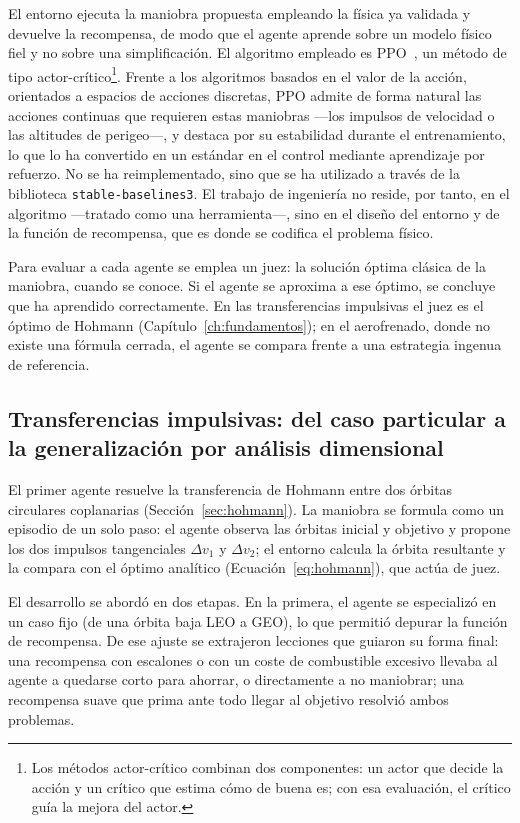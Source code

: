El entorno ejecuta la maniobra propuesta empleando la física ya validada y devuelve la recompensa, de modo que el agente aprende sobre un modelo físico fiel y no sobre una simplificación. El algoritmo empleado es \gls{PPO}~\cite{schulman2017ppo}, un método de tipo actor-crítico\footnote{Los métodos actor-crítico combinan dos componentes: un actor que decide la acción y un crítico que estima cómo de buena es; con esa evaluación, el crítico guía la mejora del actor.}. Frente a los algoritmos basados en el valor de la acción, orientados a espacios de acciones discretas, \gls{PPO} admite de forma natural las acciones continuas que requieren estas maniobras ---los impulsos de velocidad o las altitudes de perigeo---, y destaca por su estabilidad durante el entrenamiento, lo que lo ha convertido en un estándar en el control mediante aprendizaje por refuerzo. No se ha reimplementado, sino que se ha utilizado a través de la biblioteca \texttt{stable-baselines3}. El trabajo de ingeniería no reside, por tanto, en el algoritmo ---tratado como una herramienta---, sino en el diseño del entorno y de la función de recompensa, que es donde se codifica el problema físico.

Para evaluar a cada agente se emplea un juez: la solución óptima clásica de la maniobra, cuando se conoce. Si el agente se aproxima a ese óptimo, se concluye que ha aprendido correctamente. En las transferencias impulsivas el juez es el óptimo de Hohmann (Capítulo~\ref{ch:fundamentos}); en el aerofrenado, donde no existe una fórmula cerrada, el agente se compara frente a una estrategia ingenua de referencia.

\subsection{Transferencias impulsivas: del caso particular a la generalización por análisis dimensional}
\label{sec:ia-transfer}

El primer agente resuelve la transferencia de Hohmann entre dos órbitas circulares coplanarias (Sección~\ref{sec:hohmann}). La maniobra se formula como un episodio de un solo paso: el agente observa las órbitas inicial y objetivo y propone los dos impulsos tangenciales $\Delta v_1$ y $\Delta v_2$; el entorno calcula la órbita resultante y la compara con el óptimo analítico (Ecuación~\ref{eq:hohmann}), que actúa de juez.

El desarrollo se abordó en dos etapas. En la primera, el agente se especializó en un caso fijo (de una órbita baja \gls{LEO} a \gls{GEO}), lo que permitió depurar la función de recompensa. De ese ajuste se extrajeron lecciones que guiaron su forma final: una recompensa con escalones o con un coste de combustible excesivo llevaba al agente a quedarse corto para ahorrar, o directamente a no maniobrar; una recompensa suave que prima ante todo llegar al objetivo resolvió ambos problemas.

